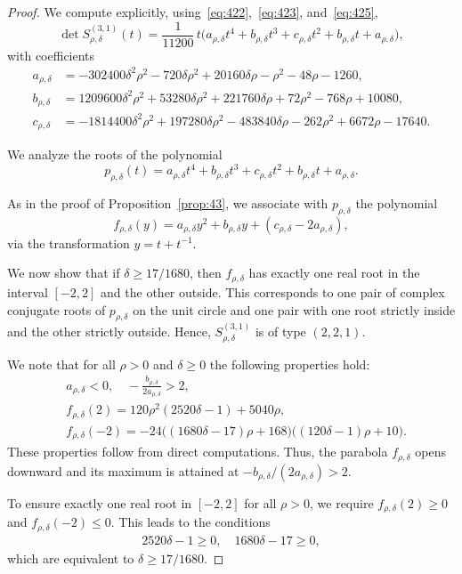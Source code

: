 \documentclass[addpoints,12pt,letter]{article}
\newcommand{\de}{\delta}
\newcommand{\SR}{S}
\renewcommand{\ge}{\geqslant}
\renewcommand{\le}{\leqslant}
\numberwithin{equation}{section}
\theoremstyle{definition}
\begin{document}
\begin{proof}
We compute explicitly, using~\eqref{eq:422},~\eqref{eq:423}, and~\eqref{eq:425},
\[
\det \SR_{\rho,\de}^{(3,1)}(t)=\frac{1}{11200}\, t \big(a_{\rho,\de} t^{4}+b_{\rho,\de} t^{3}+c_{\rho,\de} t^{2}+b_{\rho,\de} t+a_{\rho,\de}\big),
\]
with coefficients
\begin{align*}
a_{\rho,\de} &=-302400\de^{2}\rho^{2}-720\de\rho^{2}+20160\de\rho-\rho^{2}-48\rho-1260,
\\
b_{\rho,\de} &=1209600\de^{2}\rho^{2}+53280\de\rho^{2}+221760\de\rho+72\rho^{2}-768\rho+10080,
\\
c_{\rho,\de} &=-1814400\de^{2}\rho^{2}+197280\de\rho^{2}-483840\de\rho-262\rho^{2}+6672\rho-17640.
\end{align*}

We analyze the roots of the polynomial
\[
p_{\rho,\de}(t)=a_{\rho,\de} t^{4}+b_{\rho,\de} t^{3}+c_{\rho,\de} t^{2}+b_{\rho,\de} t+a_{\rho,\de}.
\]

As in the proof of Proposition~\ref{prop:43}, we associate with $p_{\rho,\de}$ the polynomial
\[
f_{\rho,\de}(y)=a_{\rho,\de} y^{2}+b_{\rho,\de} y+(c_{\rho,\de}-2a_{\rho,\de}),
\]
via the transformation $y=t+t^{-1}$.

We now show that if $\de\ge 17/1680$, then $f_{\rho,\de}$ has exactly one real root in the interval $[-2,2]$ and the other outside.
This corresponds to one pair of complex conjugate roots of $p_{\rho,\de}$ on the unit circle and one pair with one root strictly inside and the other strictly outside.
Hence, $\SR_{\rho,\de}^{(3,1)}$ is of type $(2,2,1)$.

We note that for all $\rho>0$ and $\de\ge 0$ the following properties hold:
\[
\begin{aligned}
& a_{\rho,\de}<0,\quad-\frac{b_{\rho,\de}}{2a_{\rho,\de}}>2,\\
& f_{\rho,\de}(2)=120\rho^{2}(2520\de-1)+5040\rho,\\[1ex]
& f_{\rho,\de}(-2)=-24\big((1680\de-17)\rho+168\big)\big((120\de-1)\rho+10\big).
\end{aligned}
\]
These properties follow from direct computations.
Thus, the parabola $f_{\rho,\de}$ opens downward and its maximum is attained at $-b_{\rho,\de}/(2a_{\rho,\de})>2$.

To ensure exactly one real root in $[-2,2]$ for all $\rho>0$, we require $f_{\rho,\de}(2)\ge 0$ and $f_{\rho,\de}(-2)\le 0$.
This leads to the conditions
\begin{align*}
2520\de-1\ge 0,\quad 1680\de-17\ge 0,
\end{align*}
which are equivalent to $\de\ge 17/1680$.
\end{proof}
\end{document}
